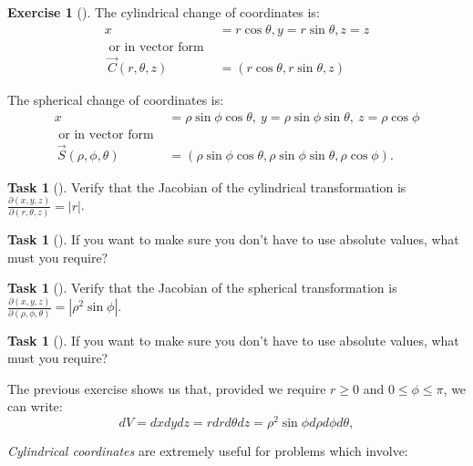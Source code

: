 \documentclass[10pt,]{book}
\theoremstyle{plain}
\theoremstyle{definition}
\theoremstyle{definition}
\theoremstyle{definition}
\theoremstyle{definition}
\newtheorem{exploration}[project]{Exercise}
\newtheorem{task}[project]{Task}
\theoremstyle{definition}
\numberwithin{equation}{section}
\newcommand{\ds}{\displaystyle}
\newcommand{\amp}{&}
\begin{document}
\begin{exploration}[]\label{exploration-302}
The cylindrical change of coordinates is:%
\begin{align*}
x\amp =r\cos\theta, y=r\sin\theta, z=z\\
\text{ or in vector form } \amp \\\
\vec C(r,\theta,z) \amp = (r\cos\theta,r\sin\theta, z)
\end{align*}
%
\par
The spherical change of coordinates is:%
\begin{align*}
x\amp =\rho\sin\phi\cos\theta,\ y=\rho\sin\phi\sin\theta,\ z=\rho\cos\phi\\
\text{ or in vector form } \amp \\\
\vec S(\rho,\phi,\theta) \amp = (\rho\sin\phi\cos\theta,\rho\sin\phi\sin\theta,\rho\cos\phi).
\end{align*}
%
\begin{task}[]\label{task-829}
Verify that the Jacobian of the cylindrical transformation is \(\ds\frac{\partial(x,y,z)}{\partial(r,\theta,z)} = |r|\). \leavevmode%
\begin{itemize}[label=\textbullet]
\begin{task}[]\label{task-830}
If you want to make sure you don't have to use absolute values, what must you require?%
\end{task}
\end{itemize}
%
\end{task}
\begin{task}[]\label{task-831}
Verify that the Jacobian of the spherical transformation is \(\ds\frac{\partial(x,y,z)}{\partial(\rho,\phi,\theta)} = |\rho^2\sin\phi|\). \leavevmode%
\begin{itemize}[label=\textbullet]
\begin{task}[]\label{task-832}
If you want to make sure you don't have to use absolute values, what must you require?%
\end{task}
\end{itemize}
%
\end{task}
\end{exploration}
The previous exercise shows us that, provided we require \(r\geq0\) and \(0\leq \phi\leq \pi\), we can write:%
\begin{equation*}
dV=dxdydz = rdrd\theta dz = \rho^2\sin\phi d\rho d\phi d\theta,
\end{equation*}
%
\par
\emph{Cylindrical coordinates} are extremely useful for problems which involve: \leavevmode%
\end{document}
